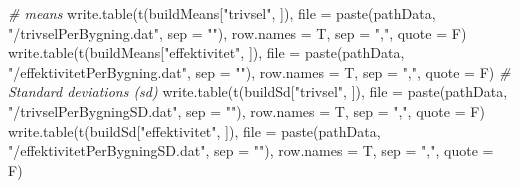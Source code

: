 \documentclass[
]{article}
\newenvironment{Shaded}{\begin{snugshade}}{\end{snugshade}}
\newcommand{\AttributeTok}[1]{\textcolor[rgb]{0.77,0.63,0.00}{#1}}
\newcommand{\CommentTok}[1]{\textcolor[rgb]{0.56,0.35,0.01}{\textit{#1}}}
\newcommand{\FunctionTok}[1]{\textcolor[rgb]{0.00,0.00,0.00}{#1}}
\newcommand{\NormalTok}[1]{#1}
\newcommand{\StringTok}[1]{\textcolor[rgb]{0.31,0.60,0.02}{#1}}
\begin{document}
\begin{Shaded}
\begin{Highlighting}[]
\CommentTok{\# means}
\FunctionTok{write.table}\NormalTok{(}\FunctionTok{t}\NormalTok{(buildMeans[}\StringTok{"trivsel"}\NormalTok{, ]), }\AttributeTok{file =} \FunctionTok{paste}\NormalTok{(pathData, }\StringTok{"/trivselPerBygning.dat"}\NormalTok{,}
    \AttributeTok{sep =} \StringTok{""}\NormalTok{), }\AttributeTok{row.names =}\NormalTok{ T, }\AttributeTok{sep =} \StringTok{","}\NormalTok{, }\AttributeTok{quote =}\NormalTok{ F)}
\FunctionTok{write.table}\NormalTok{(}\FunctionTok{t}\NormalTok{(buildMeans[}\StringTok{"effektivitet"}\NormalTok{, ]), }\AttributeTok{file =} \FunctionTok{paste}\NormalTok{(pathData, }\StringTok{"/effektivitetPerBygning.dat"}\NormalTok{,}
    \AttributeTok{sep =} \StringTok{""}\NormalTok{), }\AttributeTok{row.names =}\NormalTok{ T, }\AttributeTok{sep =} \StringTok{","}\NormalTok{, }\AttributeTok{quote =}\NormalTok{ F)}
\CommentTok{\# Standard deviations (sd)}
\FunctionTok{write.table}\NormalTok{(}\FunctionTok{t}\NormalTok{(buildSd[}\StringTok{"trivsel"}\NormalTok{, ]), }\AttributeTok{file =} \FunctionTok{paste}\NormalTok{(pathData, }\StringTok{"/trivselPerBygningSD.dat"}\NormalTok{,}
    \AttributeTok{sep =} \StringTok{""}\NormalTok{), }\AttributeTok{row.names =}\NormalTok{ T, }\AttributeTok{sep =} \StringTok{","}\NormalTok{, }\AttributeTok{quote =}\NormalTok{ F)}
\FunctionTok{write.table}\NormalTok{(}\FunctionTok{t}\NormalTok{(buildSd[}\StringTok{"effektivitet"}\NormalTok{, ]), }\AttributeTok{file =} \FunctionTok{paste}\NormalTok{(pathData, }\StringTok{"/effektivitetPerBygningSD.dat"}\NormalTok{,}
    \AttributeTok{sep =} \StringTok{""}\NormalTok{), }\AttributeTok{row.names =}\NormalTok{ T, }\AttributeTok{sep =} \StringTok{","}\NormalTok{, }\AttributeTok{quote =}\NormalTok{ F)}
\end{Highlighting}
\end{Shaded}
\end{document}
